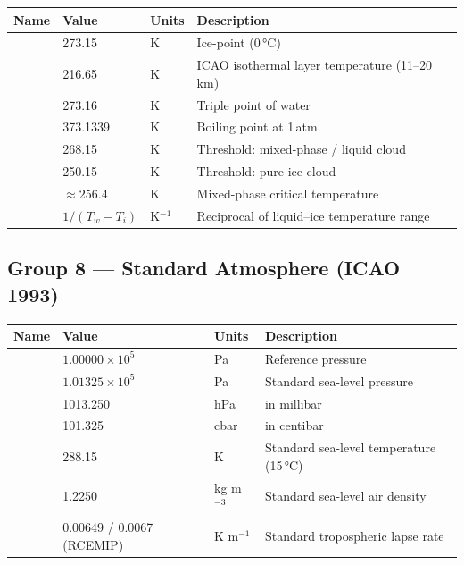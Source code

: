 \begin{longtable}{L{3.5cm} L{3cm} L{2cm} L{5.5cm}}
  \toprule
  \textbf{Name} & \textbf{Value} & \textbf{Units} & \textbf{Description} \\
  \midrule
  \endhead
  \bottomrule
  \endfoot
             & 273.15  & K & Ice-point (0\,°C) \\
              & 216.65  & K & ICAO isothermal layer temperature (11--20\,km) \\
             & 273.16  & K & Triple point of water \\
             & 373.1339& K & Boiling point at 1\,atm \\
             & 268.15  & K & Threshold: mixed-phase / liquid cloud \\
             & 250.15  & K & Threshold: pure ice cloud \\
             & $\approx256.4$& K & Mixed-phase critical temperature \\
   & $1/(T_w-T_i)$& K$^{-1}$ & Reciprocal of liquid--ice temperature range \\
\end{longtable}

\subsection{Group 8 --- Standard Atmosphere (ICAO 1993)}

\begin{longtable}{L{3cm} L{3.5cm} L{3cm} L{5cm}}
  \toprule
  \textbf{Name} & \textbf{Value} & \textbf{Units} & \textbf{Description} \\
  \midrule
  \endhead
  \bottomrule
  \endfoot
      & $1.00000\times10^5$ & Pa   & Reference pressure \\
     & $1.01325\times10^5$ & Pa   & Standard sea-level pressure \\
   & 1013.250            & hPa  &  in millibar \\
   & 101.325             & cbar &  in centibar \\
     & 288.15              & K    & Standard sea-level temperature (15\,°C) \\
   & 1.2250              & kg m$^{-3}$ & Standard sea-level air density \\
    & 0.00649 / 0.0067 (RCEMIP) & K m$^{-1}$ & Standard tropospheric lapse rate \\
\end{longtable}

